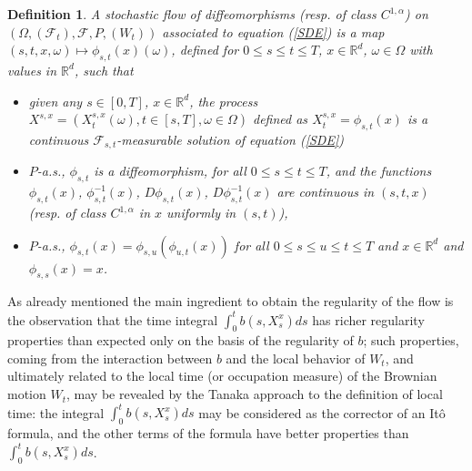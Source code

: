 \documentclass[a4paper,10pt]{article}
\newtheorem{definition}[theorem]{Definition}
\begin{document}
\begin{definition}
A \emph{stochastic flow of diffeomorphisms} (resp. \emph{of class}
$C^{1,\alpha}$) on $\left(  \Omega,\left(  \mathcal{F}{}_{t}\right)
,{}\mathcal{F},P,\left(  W_{t}\right)  \right)  $ associated to equation
(\ref{SDE}) is a map $(s,t,x,\omega)\mapsto\phi_{s,t}(x)\left(  \omega\right)
$, defined for $0\leq s\leq t\leq T$, $x\in{\mathbb{R}}^{d}$, $\omega\in
\Omega$ with values in ${\mathbb{R}}^{d}$, such that

\begin{itemize}
\item [(a)]given any $s\in\left[  0,T\right]  $, $x\in{\mathbb{R}}^{d}$, the
process $X^{s,x}=\left(  X_{t}^{s,x}\left(  \omega\right)  ,t\in\left[
s,T\right]  ,\omega\in\Omega\right)  $ defined as $X_{t}^{s,x}=\phi_{s,t}(x)$
is a continuous $\mathcal{F}_{s,t}$-measurable solution of equation (\ref{SDE})

\item[(b)] $P$-a.s., $\phi_{s,t}$ is a diffeomorphism, for all
$0\leq s\leq t\leq T$, and the functions $\phi_{s,t}(x)$,
$\phi_{s,t}^{-1}(x)$, $D\phi_{s,t}(x)$, $D\phi_{s,t}^{-1}(x)$ are
continuous in $(s,t,x)$ (resp. of class $C^{1,\alpha}$ in $x$
uniformly in $(s,t)$),

\item[(c)] $P$-a.s., $\phi_{s,t}(x)=\phi_{s,u}(\phi_{u,t}(x))$ for all $0\leq
s\leq u\leq t\leq T$ and $x\in{\mathbb{R}}^{d}$ and $\phi_{s,s}(x)=x$.
\end{itemize}
\end{definition}

 As already mentioned
the main ingredient  to obtain the regularity of the flow is the
observation that the time integral
$\int_{0}^{t}b\left(s,X_{s}^x\right)  ds$ has richer regularity
properties than expected only on the basis of the regularity of
$b$; such properties, coming from the interaction between $b$ and
the local behavior of $W_{t}$, and ultimately related to the local
time (or occupation measure) of the Brownian motion $W_{t}$, may
be revealed by the Tanaka approach to the definition of local
time: the integral $\int_{0}^{t}b\left(  s,X_{s}^x\right)  ds$ may
be considered as the corrector of an It\^{o} formula, and the
other terms of the formula have better properties than
$\int_{0}^{t}b\left( s,X_{s}^x\right)  ds$.
\end{document}

